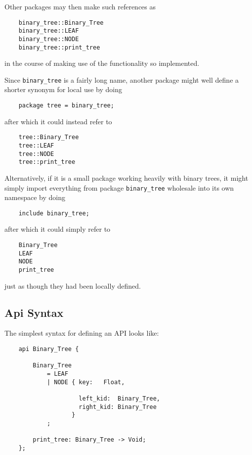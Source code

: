 Other packages may then make such references as

\begin{verbatim}
    binary_tree::Binary_Tree
    binary_tree::LEAF
    binary_tree::NODE
    binary_tree::print_tree
\end{verbatim}

in the course of making use of the functionality so implemented.

Since {\tt binary\_tree} is a fairly long name, another package might 
well define a shorter synonym for local use by doing

\begin{verbatim}
    package tree = binary_tree;
\end{verbatim}

after which it could instead refer to

\begin{verbatim}
    tree::Binary_Tree
    tree::LEAF
    tree::NODE
    tree::print_tree
\end{verbatim}

Alternatively, if it is a small package working heavily with binary trees, 
it might simply import everything from package {\tt binary\_tree} wholesale 
into its own namespace by doing

\begin{verbatim}
    include binary_tree;
\end{verbatim}

after which it could simply refer to

\begin{verbatim}
    Binary_Tree
    LEAF
    NODE
    print_tree
\end{verbatim}

just as though they had been locally defined.


\cutend*

\subsection{Api Syntax}
\label{section:ref:api-syntax}

The simplest syntax for defining an API looks like:

\begin{verbatim}
    api Binary_Tree {

        Binary_Tree
            = LEAF
            | NODE { key:   Float,

                     left_kid:  Binary_Tree,
                     right_kid: Binary_Tree
                   }
            ;

        print_tree: Binary_Tree -> Void;
    };
\end{verbatim}

